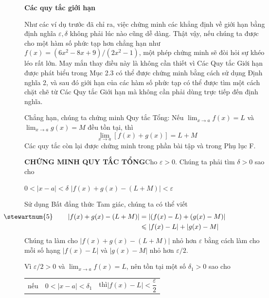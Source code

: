 \begin{minipage}[t][\textheight][t]{120mm}
    \vspace{1.0em}
    \noindent{\color{stewartcyan}\rule{1.1ex}{1.1ex}}\hspace{0.5em}\textbf{\textsf{\large Các quy tắc giới hạn}}

    \vspace{0.2em}
    Như các ví dụ trước đã chỉ ra, việc chứng minh các khẳng định về giới hạn bằng định nghĩa $\varepsilon, \delta$ không phải lúc nào cũng dễ dàng. Thật vậy, nếu chúng ta được cho một hàm số phức tạp hơn chẳng hạn như $f(x) = (6x^2 - 8x + 9)/(2x^2 - 1)$, một phép chứng minh sẽ đòi hỏi sự khéo léo rất lớn. May mắn thay điều này là không cần thiết vì Các Quy tắc Giới hạn được phát biểu trong Mục 2.3 có thể được chứng minh bằng cách sử dụng Định nghĩa 2, và sau đó giới hạn của các hàm số phức tạp có thể được tìm một cách chặt chẽ từ Các Quy tắc Giới hạn mà không cần phải dùng trực tiếp đến định nghĩa.

    \par\hspace*{1.5em}Chẳng hạn, chúng ta chứng minh Quy tắc Tổng: Nếu $\displaystyle\lim_{x \to a} f(x) = L$ và $\displaystyle\lim_{x \to a} g(x) = M$ đều tồn tại, thì
    \[
    \lim_{x \to a} [f(x) + g(x)] = L + M
    \]
    Các quy tắc còn lại được chứng minh trong phần bài tập và trong Phụ lục F.

    \vspace{0.6em}
    \noindent\textbf{\textsf{\color{stewartred}CHỨNG MINH QUY TẮC TỔNG}}\quad Cho $\varepsilon > 0$. Chúng ta phải tìm $\delta > 0$ sao cho
    \begin{center}
    \qquad $0 < |x - a| < \delta$ \qquad{}\qquad $|f(x) + g(x) - (L + M)| < \varepsilon$
    \end{center}
    Sử dụng Bất đẳng thức Tam giác, chúng ta có thể viết
    \begin{align*}
    \makebox[0pt][r]{\stewartnum{5}\hspace{2.2em}} |f(x) + g(x) - (L + M)| &= |(f(x) - L) + (g(x) - M)| \\
    &\leqslant |f(x) - L| + |g(x) - M|
    \end{align*}
    Chúng ta làm cho $|f(x) + g(x) - (L + M)|$ nhỏ hơn $\varepsilon$ bằng cách làm cho mỗi số hạng $|f(x) - L|$ và $|g(x) - M|$ nhỏ hơn $\varepsilon/2$.

    \par\hspace*{1.5em}Vì $\varepsilon/2 > 0$ và $\displaystyle\lim_{x \to a} f(x) = L$, nên tồn tại một số $\delta_1 > 0$ sao cho
    \begin{center}
    \renewcommand{\arraystretch}{1.2}
    \begin{tabular}{l@{\qquad}l@{\qquad}l}
    nếu & $0 < |x - a| < \delta_1$ & thì\qquad $|f(x) - L| < \dfrac{\varepsilon}{2}$
    \end{tabular}
    \end{center}


\end{minipage}
